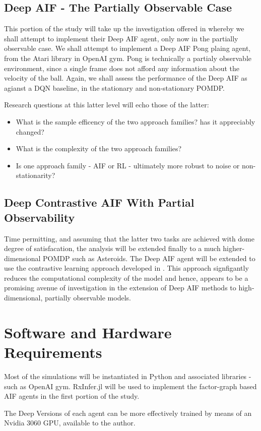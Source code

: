 \documentclass[12pt, twoside]{report}
\begin{document}
\subsection{Deep AIF - The Partially Observable Case}
This portion of the study will take up the investigation offered in \textcite{Scaling-AIF} whereby we shall attempt to implement their Deep AIF agent, only now in the partially observable case. 
We shall attempt to implement a Deep AIF Pong plaing agent, from the Atari library in OpenAI gym. Pong is technically a partialy observable environment, since a single frame does not afford any information about the velocity of the ball. Again, we shall assess the performance of the Deep AIF as agianst a DQN baseline, in the stationary and non-stationary POMDP.  

Research questions at this latter level will echo those of the latter:
\begin{itemize}
\item What is the sample efficency of the two approach families? has it appreciably changed?
\item What is the complexity of the two approach families?
\item Is one approach family - AIF or RL - ultimately more robust to noise or non-stationarity?
\end{itemize}
  
\subsection{Deep Contrastive AIF With Partial Observability}
Time permitting, and assuming that the latter two tasks are achieved with dome degree of satisfacation, the analysis will be extended finally to a much higher-dimensional POMDP such as Asteroids. The Deep AIF agent will be extended to use the contrastive learning approach developed in \textcite{Contrastive-AIF}. This approach signfigantly reduces the computational complexity of the model and hence, appears to be a promising avenue of investigation in the extension of Deep AIF methods to high-dimensional, partially observable models.   

\section{Software and Hardware Requirements}
Most of the simulations will be instantiated in Python and associated libraries  - such as OpenAI gym.
RxInfer.jl will be used to implement the factor-graph based AIF agents in the first portion of the study.

The Deep Versions of each agent can be more effectively trained by means of an Nvidia 3060 GPU, available to the author.  


\printbibliography
\end{document}
